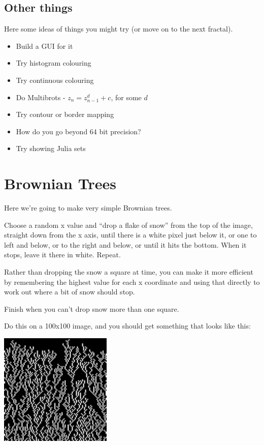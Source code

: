 \documentclass{article}
\begin{document}
        \subsection{Other things}
            Here some ideas of things you might try (or move on to the next fractal).
            \begin{itemize}
                \item Build a GUI for it
                \item Try histogram colouring
                \item Try continuous colouring
                \item Do Multibrots - $z_n = z_{n-1}^d + c$, for some $d$
                \item Try contour or border mapping
                \item How do you go beyond 64 bit precision?
                \item Try showing Julia sets
            \end{itemize}
        \newpage
        
    \section{Brownian Trees}
        Here we're going to make very simple Brownian trees.  
        
        Choose a random x value and ``drop a flake of snow'' from the top of the image, straight down from the x axis, until there is a
        white pixel just below it, or one to left and below, or to the right and below, or until it hits the bottom. When it stops, leave
        it there in white. Repeat.
        
        Rather than dropping the snow a square at time, you can make it more efficient by remembering the highest value for each x
        coordinate and using that directly to work out where a bit of snow should stop.
        
        Finish when you can't drop snow more than one square.
        
        Do this on a 100x100 image, and you should get something that looks like this:
        
        \begin{center}
            \includegraphics[width=0.4\textwidth]{snow}
        \end{center}
        
\end{document}
